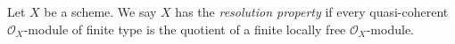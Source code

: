 \begin{definition}
\label{definition-resolution-property}
Let $X$ be a scheme. We say $X$ has the {\it resolution property}
if every quasi-coherent $\mathcal{O}_X$-module of finite type
is the quotient of a finite locally free $\mathcal{O}_X$-module.
\end{definition}